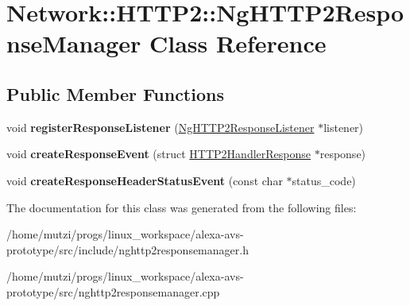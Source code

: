 \hypertarget{classNetwork_1_1HTTP2_1_1NgHTTP2ResponseManager}{}\section{Network\+:\+:H\+T\+T\+P2\+:\+:Ng\+H\+T\+T\+P2\+Response\+Manager Class Reference}
\label{classNetwork_1_1HTTP2_1_1NgHTTP2ResponseManager}
\subsection*{Public Member Functions}
\begin{DoxyCompactItemize}
\item 
\mbox{\label{classNetwork_1_1HTTP2_1_1NgHTTP2ResponseManager_a82a0ae30e4af2a82cdd5f27e863bc4a2}} 
void {\bfseries register\+Response\+Listener} (\hyperlink{classNetwork_1_1HTTP2_1_1NgHTTP2ResponseListener}{Ng\+H\+T\+T\+P2\+Response\+Listener} $\ast$listener)
\item 
\mbox{\label{classNetwork_1_1HTTP2_1_1NgHTTP2ResponseManager_a655ae86a9ac8e0761bd2baf93ed64d6c}} 
void {\bfseries create\+Response\+Event} (struct \hyperlink{structNetwork_1_1HTTP2_1_1HTTP2HandlerResponse}{H\+T\+T\+P2\+Handler\+Response} $\ast$response)
\item 
\mbox{\label{classNetwork_1_1HTTP2_1_1NgHTTP2ResponseManager_ab7f32d52cc08a5ce69978c64dff33144}} 
void {\bfseries create\+Response\+Header\+Status\+Event} (const char $\ast$status\+\_\+code)
\end{DoxyCompactItemize}


The documentation for this class was generated from the following files\+:\begin{DoxyCompactItemize}
\item 
/home/mutzi/progs/linux\+\_\+workspace/alexa-\/avs-\/prototype/src/include/nghttp2responsemanager.\+h\item 
/home/mutzi/progs/linux\+\_\+workspace/alexa-\/avs-\/prototype/src/nghttp2responsemanager.\+cpp\end{DoxyCompactItemize}
